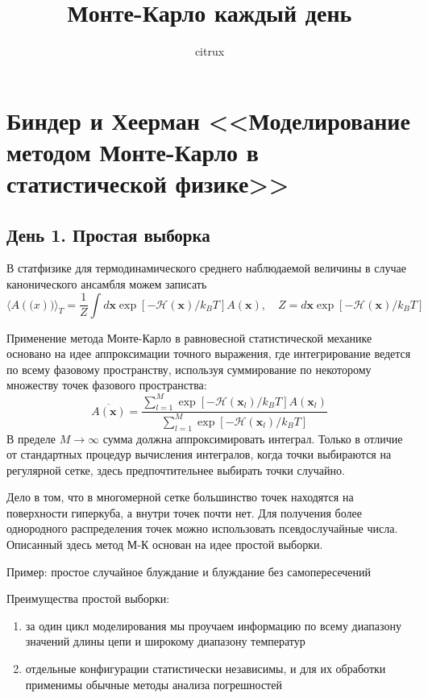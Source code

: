 \documentclass[article]{ncc}
\author{citrux}
\title{Монте-Карло каждый день}
\renewcommand{\vec}[1]{\boldsymbol{#1}}
\begin{document}
\maketitle
\tableofcontents
\onehalfspacing

\section{Биндер и Хеерман <<Моделирование методом Монте-Карло в статистической физике>>}
\subsection{День 1. Простая выборка}

В статфизике для термодинамического среднего наблюдаемой величины в случае канонического ансамбля можем записать
\begin{equation}
    \langle A(\vec(x)) \rangle_T = \frac{1}{Z}\int d\vec{x} \exp[-\mathcal{H}(\vec{x})/k_BT]A(\vec{x}),
    \quad Z=d\vec{x} \exp[-\mathcal{H}(\vec{x})/k_BT]
\end{equation}

Применение метода Монте-Карло в равновесной статистической механике основано на идее аппроксимации точного выражения, где интегрирование ведется по всему фазовому пространству, используя суммирование по некоторому множеству точек фазового пространства:
\begin{equation}
\overline{A(\vec{x})}=\frac{\sum\limits_{l=1}^{M} \exp[-\mathcal{H}(\vec{x}_l)/k_BT]A(\vec{x}_l)}
                              {\sum\limits_{l=1}^{M} \exp[-\mathcal{H}(\vec{x}_l)/k_BT]}
\end{equation}
В пределе \(M \to \infty\) сумма должна аппроксимировать интеграл.
Только в отличие от стандартных процедур вычисления интегралов, когда точки выбираются на регулярной сетке, здесь предпочтительнее выбирать точки случайно.

Дело в том, что в многомерной сетке большинство точек находятся на поверхности гиперкуба, а внутри точек почти нет. Для получения более однородного распределения точек можно использовать псевдослучайные числа. Описанный здесь метод М-К основан на идее простой выборки.

Пример: простое случайное блуждание и блуждание без самопересечений

Преимущества простой выборки:
\begin{enumerate}
    \item за один цикл моделирования мы проучаем информацию по всему диапазону значений длины цепи и широкому диапазону температур
    \item отдельные конфигурации статистически независимы, и для их обработки применимы обычные методы анализа погрешностей
\end{enumerate}
\end{document}
